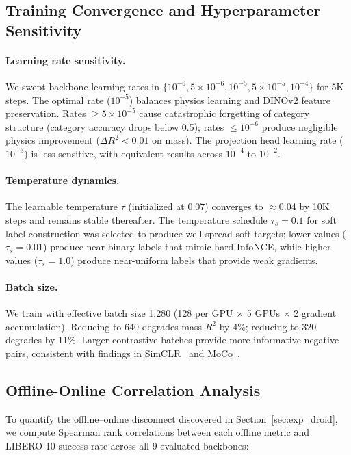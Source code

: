 \documentclass{article}
\begin{document}
\subsection{Training Convergence and Hyperparameter Sensitivity}
\label{app:convergence}

\paragraph{Learning rate sensitivity.} We swept backbone learning rates in $\{10^{-6}, 5 \times 10^{-6}, 10^{-5}, 5 \times 10^{-5}, 10^{-4}\}$ for 5K steps. The optimal rate ($10^{-5}$) balances physics learning and DINOv2 feature preservation. Rates $\ge 5 \times 10^{-5}$ cause catastrophic forgetting of category structure (category accuracy drops below 0.5); rates $\le 10^{-6}$ produce negligible physics improvement ($\Delta R^2 < 0.01$ on mass). The projection head learning rate ($10^{-3}$) is less sensitive, with equivalent results across $10^{-4}$ to $10^{-2}$.

\paragraph{Temperature dynamics.} The learnable temperature $\tau$ (initialized at 0.07) converges to $\approx$0.04 by 10K steps and remains stable thereafter. The temperature schedule $\tau_s = 0.1$ for soft label construction was selected to produce well-spread soft targets; lower values ($\tau_s = 0.01$) produce near-binary labels that mimic hard InfoNCE, while higher values ($\tau_s = 1.0$) produce near-uniform labels that provide weak gradients.

\paragraph{Batch size.} We train with effective batch size 1,280 (128 per GPU $\times$ 5 GPUs $\times$ 2 gradient accumulation). Reducing to 640 degrades mass $R^2$ by 4\%; reducing to 320 degrades by 11\%. Larger contrastive batches provide more informative negative pairs, consistent with findings in SimCLR~\cite{chen2020simclr} and MoCo~\cite{he2020moco}.

\subsection{Offline-Online Correlation Analysis}
\label{app:correlation}

To quantify the offline--online disconnect discovered in Section~\ref{sec:exp_droid}, we compute Spearman rank correlations between each offline metric and LIBERO-10 success rate across all 9 evaluated backbones:
\end{document}
